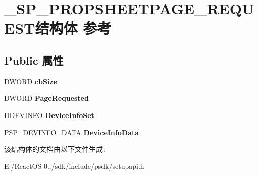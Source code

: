 \hypertarget{struct___s_p___p_r_o_p_s_h_e_e_t_p_a_g_e___r_e_q_u_e_s_t}{}\section{\+\_\+\+S\+P\+\_\+\+P\+R\+O\+P\+S\+H\+E\+E\+T\+P\+A\+G\+E\+\_\+\+R\+E\+Q\+U\+E\+S\+T结构体 参考}
\label{struct___s_p___p_r_o_p_s_h_e_e_t_p_a_g_e___r_e_q_u_e_s_t}
\subsection*{Public 属性}
\begin{DoxyCompactItemize}
\item 
\mbox{\label{struct___s_p___p_r_o_p_s_h_e_e_t_p_a_g_e___r_e_q_u_e_s_t_af5ac3794bfea05f9e2fcd5c9085082d1}} 
D\+W\+O\+RD {\bfseries cb\+Size}
\item 
\mbox{\label{struct___s_p___p_r_o_p_s_h_e_e_t_p_a_g_e___r_e_q_u_e_s_t_a04cc44219e5cbe003dc45bb668a272b9}} 
D\+W\+O\+RD {\bfseries Page\+Requested}
\item 
\mbox{\label{struct___s_p___p_r_o_p_s_h_e_e_t_p_a_g_e___r_e_q_u_e_s_t_a52eb773c8135dc648d9cf78d27995e0b}} 
\hyperlink{interfacevoid}{H\+D\+E\+V\+I\+N\+FO} {\bfseries Device\+Info\+Set}
\item 
\mbox{\label{struct___s_p___p_r_o_p_s_h_e_e_t_p_a_g_e___r_e_q_u_e_s_t_a1d667cc5664550746fcc382f7c7b165e}} 
\hyperlink{struct___s_p___d_e_v_i_n_f_o___d_a_t_a}{P\+S\+P\+\_\+\+D\+E\+V\+I\+N\+F\+O\+\_\+\+D\+A\+TA} {\bfseries Device\+Info\+Data}
\end{DoxyCompactItemize}


该结构体的文档由以下文件生成\+:\begin{DoxyCompactItemize}
\item 
E\+:/\+React\+O\+S-\/0../sdk/include/psdk/setupapi.\+h\end{DoxyCompactItemize}
